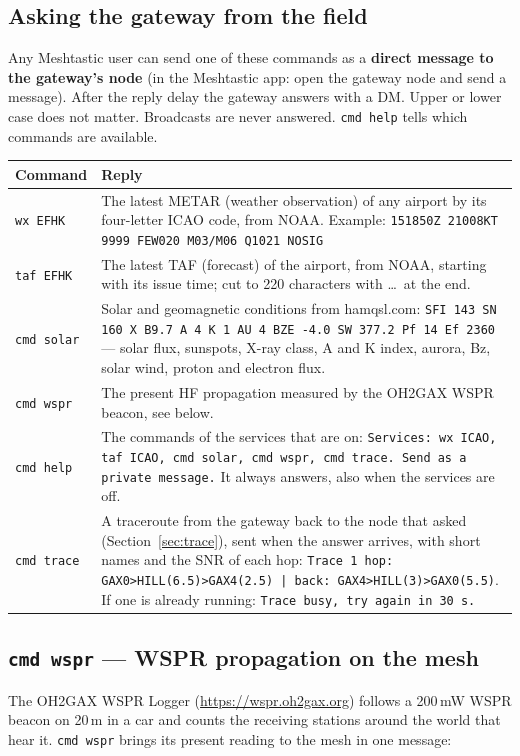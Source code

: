 \documentclass[10pt,a4paper]{article}
\newcommand{\cmd}[1]{\texttt{#1}}
\begin{document}
\subsection{Asking the gateway from the field}
Any Meshtastic user can send one of these commands as a \textbf{direct message to the gateway's node} (in the Meshtastic app: open the gateway node and send a message). After the reply delay the gateway answers with a DM. Upper or lower case does not matter. Broadcasts are never answered. \cmd{cmd help} tells which commands are available.

\begin{center}
\begin{tabularx}{\textwidth}{@{}lX@{}}
\toprule
Command & Reply \\
\midrule
\cmd{wx EFHK} & The latest METAR (weather observation) of any airport by its four-letter ICAO code, from NOAA. Example: \cmd{151850Z 21008KT 9999 FEW020 M03/M06 Q1021 NOSIG} \\
\cmd{taf EFHK} & The latest TAF (forecast) of the airport, from NOAA, starting with its issue time; cut to 220 characters with \dots\ at the end. \\
\cmd{cmd solar} & Solar and geomagnetic conditions from hamqsl.com: \cmd{SFI 143 SN 160 X B9.7 A 4 K 1 AU 4 BZE -4.0 SW 377.2 Pf 14 Ef 2360} --- solar flux, sunspots, X-ray class, A and K index, aurora, Bz, solar wind, proton and electron flux. \\
\cmd{cmd wspr} & The present HF propagation measured by the OH2GAX WSPR beacon, see below. \\
\cmd{cmd help} & The commands of the services that are on: \cmd{Services: wx ICAO, taf ICAO, cmd solar, cmd wspr, cmd trace. Send as a private message.} It always answers, also when the services are off. \\
\cmd{cmd trace} & A traceroute from the gateway back to the node that asked (Section~\ref{sec:trace}), sent when the answer arrives, with short names and the SNR of each hop: \cmd{Trace 1 hop: GAX0>HILL(6.5)>GAX4(2.5) | back: GAX4>HILL(3)>GAX0(5.5)}. If one is already running: \cmd{Trace busy, try again in 30 s.} \\
\bottomrule
\end{tabularx}
\end{center}

\subsection{\texttt{cmd wspr} --- WSPR propagation on the mesh}
The OH2GAX WSPR Logger (\url{https://wspr.oh2gax.org}) follows a 200\,mW WSPR beacon on 20\,m in a car and counts the receiving stations around the world that hear it. \cmd{cmd wspr} brings its present reading to the mesh in one message:
\end{document}
